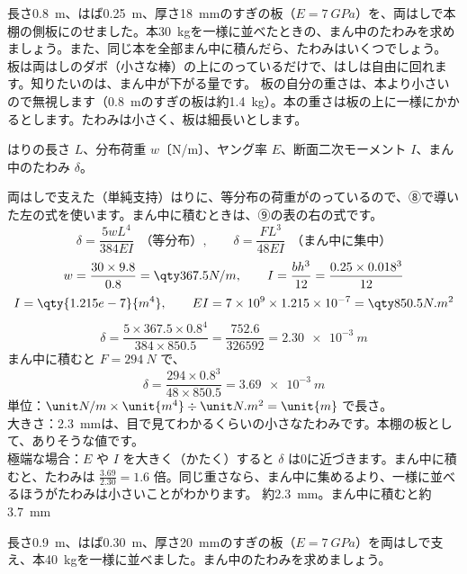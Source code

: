\begin{phreidai}
\label{ph:力-10:ex1}長さ\qty{0.8}{m}、はば\qty{0.25}{m}、厚さ\qty{18}{mm}のすぎの板（$E=\qty{7}{GPa}$）を、両はしで本棚の側板にのせました。本\qty{30}{kg}を一様に並べたときの、まん中のたわみを求めましょう。また、同じ本を全部まん中に積んだら、たわみはいくつでしょう。
\phbamen
板は両はしのダボ（小さな棒）の上にのっているだけで、はしは自由に回れます。知りたいのは、まん中が下がる量です。
\phmushi
板の自分の重さは、本より小さいので無視します（\qty{0.8}{m}のすぎの板は約\qty{1.4}{kg}）。本の重さは板の上に一様にかかるとします。たわみは小さく、板は細長いとします。
\phzu
\par\vspace{3pt}\noindent\begin{minipage}[c]{0.50\linewidth}
\end{minipage}\hfill
\begin{minipage}[c]{0.46\linewidth}
はりの長さ $L$、分布荷重 $w$〔N/m〕、ヤング率 $E$、断面二次モーメント $I$、まん中のたわみ $\delta$。
\end{minipage}
\phriyu
両はしで支えた（単純支持）はりに、等分布の荷重がのっているので、⑧で導いた左の式を使います。まん中に積むときは、⑨の表の右の式です。
\[\delta=\frac{5wL^4}{384EI}\ \ \text{（等分布）},\qquad\delta=\frac{FL^3}{48EI}\ \ \text{（まん中に集中）}\]
\phtateru
\[ w=\frac{30\times9.8}{0.8}=\pxkq{367.5}{N/m},\qquad I=\frac{bh^3}{12}=\frac{0.25\times0.018^3}{12} \]
\phtoku
\[ I=\qty{1.215e-7}{m^4},\qquad EI=7\times10^9\times1.215\times10^{-7}=\pxkq{850.5}{N.m^2} \]
\[ \delta=\frac{5\times367.5\times0.8^4}{384\times850.5}=\frac{752.6}{\num{326592}}=\qty{2.30e-3}{m} \]
まん中に積むと $F=\qty{294}{N}$ で、
\[\delta=\frac{294\times0.8^3}{48\times850.5}=\qty{3.69e-3}{m}\]
\phtashikame
単位：$\pxku{N/m}\times\unit{m^4}\div\pxku{N.m^2}=\unit{m}$ で長さ。\\
大きさ：\qty{2.3}{mm}は、目で見てわかるくらいの小さなたわみです。本棚の板として、ありそうな値です。\\
極端な場合：$E$ や $I$ を大きく（かたく）すると $\delta$ は0に近づきます。まん中に積むと、たわみは $\tfrac{3.69}{2.30}=1.6$ 倍。同じ重さなら、まん中に集めるより、一様に並べるほうがたわみは小さいことがわかります。
\kotae 約\qty{2.3}{mm}。まん中に積むと約\qty{3.7}{mm}
\end{phreidai}
\begin{jibun}
長さ\qty{0.9}{m}、はば\qty{0.30}{m}、厚さ\qty{20}{mm}のすぎの板（$E=\qty{7}{GPa}$）を両はしで支え、本\qty{40}{kg}を一様に並べました。まん中のたわみを求めましょう。
\end{jibun}

